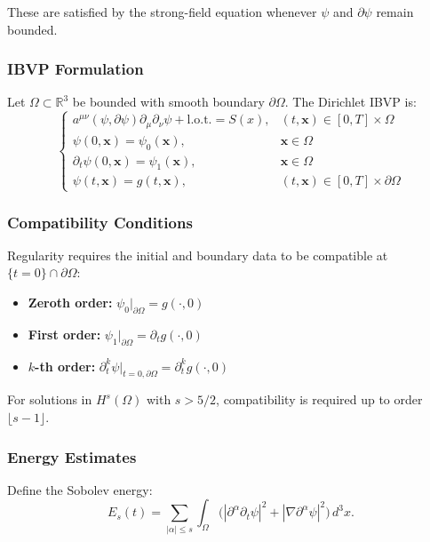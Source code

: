 These are satisfied by the \DFD strong-field equation whenever $\psi$ and 
$\partial\psi$ remain bounded.

\subsubsection{IBVP Formulation}

Let $\Omega \subset \mathbb{R}^3$ be bounded with smooth boundary 
$\partial\Omega$. The Dirichlet IBVP is:
\begin{equation}
\begin{cases}
a^{\mu\nu}(\psi,\partial\psi)\partial_\mu\partial_\nu\psi + \text{l.o.t.} = S(x), 
& (t,\mathbf{x}) \in [0,T] \times \Omega \\
\psi(0,\mathbf{x}) = \psi_0(\mathbf{x}), & \mathbf{x} \in \Omega \\
\partial_t\psi(0,\mathbf{x}) = \psi_1(\mathbf{x}), & \mathbf{x} \in \Omega \\
\psi(t,\mathbf{x}) = g(t,\mathbf{x}), & (t,\mathbf{x}) \in [0,T] \times \partial\Omega
\end{cases}
\label{eq:ibvp-formulation}
\end{equation}

\subsubsection{Compatibility Conditions}

Regularity requires the initial and boundary data to be compatible at 
$\{t = 0\} \cap \partial\Omega$:
\begin{itemize}
\item \textbf{Zeroth order:} $\psi_0|_{\partial\Omega} = g(\cdot,0)$
\item \textbf{First order:} $\psi_1|_{\partial\Omega} = \partial_t g(\cdot,0)$
\item \textbf{$k$-th order:} $\partial_t^k\psi|_{t=0,\partial\Omega} = \partial_t^k g(\cdot,0)$
\end{itemize}
For solutions in $H^s(\Omega)$ with $s > 5/2$, compatibility is required up 
to order $\lfloor s - 1 \rfloor$.

\subsubsection{Energy Estimates}

Define the Sobolev energy:
\begin{equation}
E_s(t) = \sum_{|\alpha| \leq s} \int_\Omega \big(|\partial^\alpha\partial_t\psi|^2 
+ |\nabla\partial^\alpha\psi|^2\big)\,d^3x.
\label{eq:sobolev-energy}
\end{equation}

